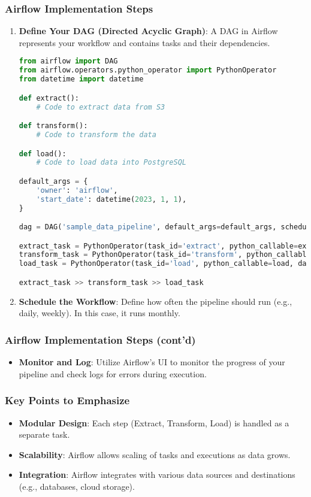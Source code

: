 \documentclass[aspectratio=169]{beamer}
\begin{document}
\begin{frame}[fragile]
    \frametitle{Airflow Implementation Steps}
    \begin{enumerate}
        \item \textbf{Define Your DAG (Directed Acyclic Graph)}:
            A DAG in Airflow represents your workflow and contains tasks and their dependencies.
            \begin{lstlisting}[language=Python]
from airflow import DAG
from airflow.operators.python_operator import PythonOperator
from datetime import datetime

def extract():
    # Code to extract data from S3

def transform():
    # Code to transform the data

def load():
    # Code to load data into PostgreSQL

default_args = {
    'owner': 'airflow',
    'start_date': datetime(2023, 1, 1),
}

dag = DAG('sample_data_pipeline', default_args=default_args, schedule_interval='@monthly')

extract_task = PythonOperator(task_id='extract', python_callable=extract, dag=dag)
transform_task = PythonOperator(task_id='transform', python_callable=transform, dag=dag)
load_task = PythonOperator(task_id='load', python_callable=load, dag=dag)

extract_task >> transform_task >> load_task
            \end{lstlisting}
        \item \textbf{Schedule the Workflow}:
            Define how often the pipeline should run (e.g., daily, weekly). In this case, it runs monthly.
    \end{enumerate}
\end{frame}

\begin{frame}
    \frametitle{Airflow Implementation Steps (cont'd)}
    \begin{itemize}
        \item \textbf{Monitor and Log}:
            Utilize Airflow's UI to monitor the progress of your pipeline and check logs for errors during execution.
    \end{itemize}
\end{frame}

\begin{frame}
    \frametitle{Key Points to Emphasize}
    \begin{itemize}
        \item \textbf{Modular Design}: Each step (Extract, Transform, Load) is handled as a separate task.
        \item \textbf{Scalability}: Airflow allows scaling of tasks and executions as data grows.
        \item \textbf{Integration}: Airflow integrates with various data sources and destinations (e.g., databases, cloud storage).
    \end{itemize}
\end{frame}
\end{document}
